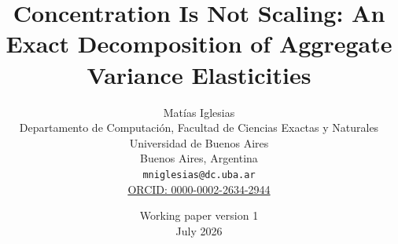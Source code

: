 \documentclass[a4paper,11pt]{article}
\title{Concentration Is Not Scaling:
An Exact Decomposition of Aggregate Variance Elasticities}
\author{%
  \begin{minipage}{0.9\textwidth}
    \centering
    Matías Iglesias\\
    Departamento de Computación,
    Facultad de Ciencias Exactas y Naturales\\
    Universidad de Buenos Aires\\
    Buenos Aires, Argentina\\
    \texttt{mniglesias@dc.uba.ar}\\
    \href{https://orcid.org/0000-0002-2634-2944}
      {ORCID: 0000-0002-2634-2944}
  \end{minipage}%
}
\date{Working paper version 1\\July 2026}
\begin{document}
\maketitle

\begin{abstract}

\end{abstract}

\SharedScientificBody



\end{document}
